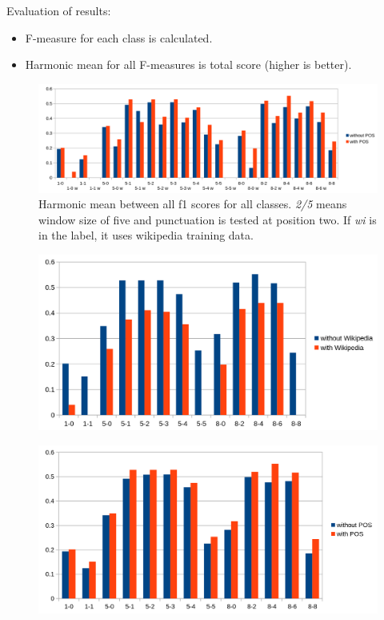 




Evaluation of results:
\begin{itemize}
\item F-measure for each class is calculated.
\item Harmonic mean for all F-measures is total score (higher is better).
\end{itemize}

\begin{figure}[ht]
    \centering
    \includegraphics[width=\textwidth]{img/window_eval.png}
    \caption{Harmonic mean between all f1 scores for all classes. \emph{2/5} means window size of five and punctuation is tested at position two. If \emph{wi} is in the label, it uses wikipedia training data.}
    \label{window_eval}
\end{figure}

\begin{figure}[ht]
    \centering
    \includegraphics[width=\textwidth]{img/window_wiki_eval.png}
    \caption{}
    \label{window_wiki_eval}
\end{figure}

\begin{figure}[ht]
    \centering
    \includegraphics[width=\textwidth]{img/window_pos_eval.png}
    \caption{}
    \label{window_pos_eval}
\end{figure}

